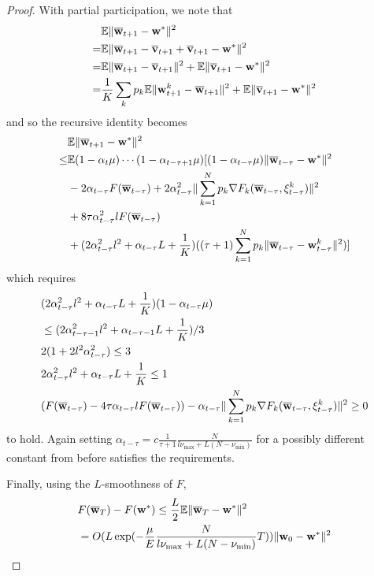 \begin{proof}
	With partial participation, we note that 
	\begin{align*}
	 & \mathbb{E}\|{\overline{\mathbf{w}}}_{t+1}-{\mathbf{w}}^{\ast}\|^{2}  \\
	 =&\mathbb{E}\|{\overline{\mathbf{w}}}_{t+1}-{\overline{\mathbf{v}}}_{t+1}+{\overline{\mathbf{v}}}_{t+1}-{\mathbf{w}}^{\ast}\|^{2}\\
	=&\mathbb{E}\|{\overline{\mathbf{w}}}_{t+1}-{\overline{\mathbf{v}}}_{t+1}\|^{2}+\mathbb{E}\|{\overline{\mathbf{v}}}_{t+1}-{\mathbf{w}}^{\ast}\|^{2}\\
	=&\frac{1}{K}\sum_{k}p_{k}\mathbb{E}\|{\mathbf{w}}_{t+1}^{k}-{\overline{\mathbf{w}}}_{t+1}\|^{2}+\mathbb{E}\|{\overline{\mathbf{v}}}_{t+1}-{\mathbf{w}}^{\ast}\|^{2}
	\end{align*}
	and so the recursive identity becomes 
	\begin{align*}
	& \mathbb{E}\|{\overline{\mathbf{w}}}_{t+1}-{\mathbf{w}}^{\ast}\|^{2} \\
	\leq&\mathbb{E}(1-\alpha_{t}\mu)\cdots(1-\alpha_{t-\tau+1}\mu)[(1-\alpha_{t-\tau}\mu)\|{\overline{\mathbf{w}}}_{t-\tau}-{\mathbf{w}}^{\ast}\|^{2}\\
	& -2\alpha_{t-\tau}F({\overline{\mathbf{w}}}_{t-\tau})+2\alpha_{t-\tau}^{2}\|\sum_{k=1}^{N}p_{k}\nabla F_{k}({\overline{\mathbf{w}}}_{t-\tau},\xi_{t-\tau}^{k})\|^{2}\\
	& +8\tau\alpha_{t-\tau}^{2}lF({\overline{\mathbf{w}}}_{t-\tau})\\
	& +(2\alpha_{t-\tau}^{2}l^{2}+\alpha_{t-\tau}L+\frac{1}{K})((\tau+1)\sum_{k=1}^{N}p_{k}\|{\overline{\mathbf{w}}}_{t-\tau}-{\mathbf{w}}_{t-\tau}^{k}\|^{2})]
	\end{align*}
	which requires 
	\begin{align*}
	& (2\alpha_{t-\tau}^{2}l^{2}+\alpha_{t-\tau}L+\frac{1}{K})(1-\alpha_{t-\tau}\mu) \\
	& \leq(2\alpha_{t-\tau-1}^{2}l^{2}+\alpha_{t-\tau-1}L+\frac{1}{K})/3\\
	& 2(1+2l^{2}\alpha_{t-\tau}^{2})  \leq3\\
	& 2\alpha_{t-\tau}^{2}l^{2}+\alpha_{t-\tau}L+\frac{1}{K} \leq1\\
	& (F({\overline{\mathbf{w}}}_{t-\tau})-4\tau\alpha_{t-\tau}lF({\overline{\mathbf{w}}}_{t-\tau}))-\alpha_{t-\tau}\|\sum_{k=1}^{N}p_{k}\nabla F_{k}({\overline{\mathbf{w}}}_{t-\tau},\xi_{t-\tau}^{k})\|^{2}  \geq0
	\end{align*}
	to hold. Again setting $\alpha_{t-\tau}=c\frac{1}{\tau+1}\frac{N}{l\nu_{\max}+L(N-\nu_{\min})}$
	for a possibly different constant from before satisfies the requirements.
	
	Finally, using the $L$-smoothness of $F$, 
	\begin{align*}
	& F({\overline{\mathbf{w}}}_{T})-F({\mathbf{w}}^{\ast})  \leq\frac{L}{2}\mathbb{E}\|{\overline{\mathbf{w}}}_{T}-{\mathbf{w}}^{\ast}\|^{2}\\
	& =O(L\exp(-\frac{\mu}{E}\frac{N}{l\nu_{\max}+L(N-\nu_{\min})}T))\|{\mathbf{w}}_{0}-{\mathbf{w}}^{\ast}\|^{2}
	\end{align*}
\end{proof}

